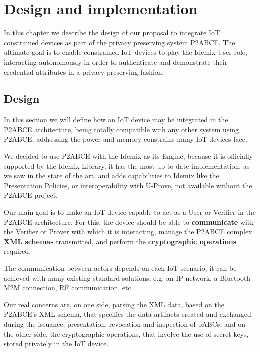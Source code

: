 \chapter{Design and implementation}\label{ch:design}

% 


In this chapter we describe the design of our proposal to integrate IoT constrained devices as part of the privacy preserving system P2ABCE. The ultimate goal is to enable constrained IoT devices to play the Idemix User role, interacting autonomously in order to authenticate and demonstrate their credential attributes in a privacy-preserving fashion.

\section{Design}

In this section we will define how an IoT device may be integrated in the P2ABCE architecture, being totally compatible with any other system using P2ABCE, addressing the power and memory constrains many IoT devices face.

We decided to use P2ABCE with the Idemix as its Engine, because it is officially supported by the Idemix Library, it has the most up-to-date implementation, as we saw in the state of the art, and adds capabilities to Idemix like the Presentation Policies, or interoperability with U-Prove, not available without the P2ABCE project.

Our main goal is to make an IoT device capable to act as a User or Verifier in the P2ABCE architecture. For this, the device should be able to \textbf{communicate} with the Verifier or Prover with which it is interacting, manage the P2ABCE complex \textbf{XML schemas} transmitted, and perform the \textbf{cryptographic operations} required.

The communication between actors depends on each IoT scenario, it can be achieved with many existing standard solutions, e.g. an IP network, a Bluetooth M2M connection, RF communication, etc.

Our real concerns are, on one side, parsing the XML data, based on the P2ABCE's XML schema, that specifies the data artifacts created and exchanged during the issuance, presentation, revocation and inspection of pABCs; and on the other side, the cryptographic operations, that involve the use of secret keys, stored privately in the IoT device.

